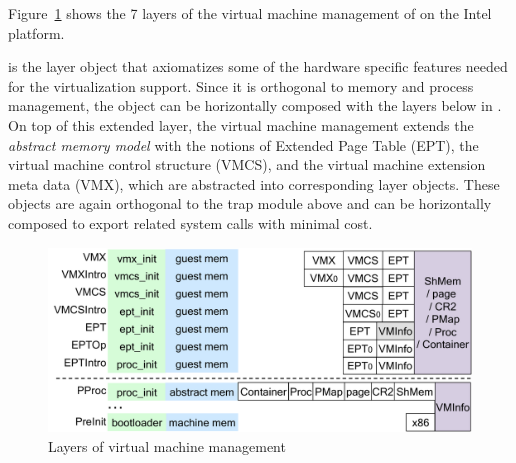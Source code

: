 Figure~\ref{fig:base:vm:layers} shows the 7 layers of the virtual
machine management of \mCTOShyper{} on the Intel platform.
 is the layer object
that axiomatizes some of the hardware specific features needed
for the virtualization support. 
Since it is orthogonal to memory and process management,
the  object can be horizontally composed with the layers 
below  in \mCTOSbase{}.
On top of this extended  layer,
the virtual machine management extends the \emph{abstract memory model}
with the notions of Extended Page Table (EPT), the virtual machine
control structure (VMCS), and the virtual machine extension meta data (VMX),
which are abstracted into corresponding layer objects.
These objects are again orthogonal to the trap module above and can be
horizontally composed to export related system calls
with minimal cost.
 
\begin{figure}[t]\centering
\includegraphics[scale=0.5]{figs/intel_layer}	
\caption{Layers of virtual machine management}
\label{fig:base:vm:layers}
\hrulefill
\end{figure}


